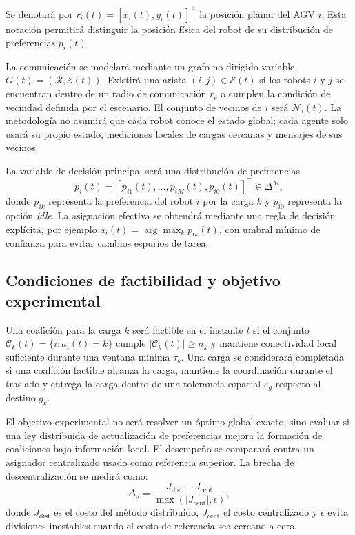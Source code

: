 \documentclass[11pt,a4paper]{article}
\begin{document}
Se denotará por $r_i(t)=[x_i(t),y_i(t)]^\top$ la posición planar del AGV $i$. Esta notación permitirá distinguir la posición física del robot de su distribución de preferencias $p_i(t)$.

La comunicación se modelará mediante un grafo no dirigido variable $G(t)=(\mathcal{R},\mathcal{E}(t))$. Existirá una arista $(i,j)\in\mathcal{E}(t)$ si los robots $i$ y $j$ se encuentran dentro de un radio de comunicación $r_c$ o cumplen la condición de vecindad definida por el escenario. El conjunto de vecinos de $i$ será $\mathcal{N}_i(t)$. La metodología no asumirá que cada robot conoce el estado global; cada agente solo usará su propio estado, mediciones locales de cargas cercanas y mensajes de sus vecinos.

La variable de decisión principal será una distribución de preferencias
\[
p_i(t)=[p_{i1}(t),\ldots,p_{iM}(t),p_{i0}(t)]^\top\in\Delta^{M},
\]
donde $p_{ik}$ representa la preferencia del robot $i$ por la carga $k$ y $p_{i0}$ representa la opción \textit{idle}. La asignación efectiva se obtendrá mediante una regla de decisión explícita, por ejemplo $a_i(t)=\arg\max_k p_{ik}(t)$, con umbral mínimo de confianza para evitar cambios espurios de tarea.

\subsection{Condiciones de factibilidad y objetivo experimental}

Una coalición para la carga $k$ será factible en el instante $t$ si el conjunto $\mathcal{C}_k(t)=\{i:a_i(t)=k\}$ cumple $|\mathcal{C}_k(t)|\geq n_k$ y mantiene conectividad local suficiente durante una ventana mínima $\tau_s$. Una carga se considerará completada si una coalición factible alcanza la carga, mantiene la coordinación durante el traslado y entrega la carga dentro de una tolerancia espacial $\varepsilon_g$ respecto al destino $g_k$.

El objetivo experimental no será resolver un óptimo global exacto, sino evaluar si una ley distribuida de actualización de preferencias mejora la formación de coaliciones bajo información local. El desempeño se comparará contra un asignador centralizado usado como referencia superior. La brecha de descentralización se medirá como:
\[
\Delta_J=\frac{J_{\mathrm{dist}}-J_{\mathrm{cent}}}{\max(|J_{\mathrm{cent}}|,\epsilon)},
\]
donde $J_{\mathrm{dist}}$ es el costo del método distribuido, $J_{\mathrm{cent}}$ el costo centralizado y $\epsilon$ evita divisiones inestables cuando el costo de referencia sea cercano a cero.
\end{document}
